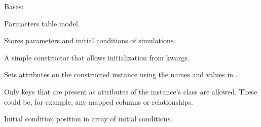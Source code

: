 \documentclass[a4paper,landscape,10pt,english]{sphinxmanual}
\begin{document}
\begin{fulllineitems}
\label{\detokenize{code_docs/simulation_API.model:simulation_API.model.models.ParameterDB}}
Bases: 

Parmaeters table model.

Stores parameters and initial conditions of simulations.

\begin{fulllineitems}
\label{\detokenize{code_docs/simulation_API.model:simulation_API.model.models.ParameterDB.__init__}}
A simple constructor that allows initialization from kwargs.

Sets attributes on the constructed instance using the names and
values in .

Only keys that are present as
attributes of the instance’s class are allowed. These could be,
for example, any mapped columns or relationships.

\end{fulllineitems}


\begin{fulllineitems}
\label{\detokenize{code_docs/simulation_API.model:simulation_API.model.models.ParameterDB.ini_cndtn_id}}
Initial condition position in array of initial conditions.

\end{fulllineitems}


\begin{fulllineitems}
\label{\detokenize{code_docs/simulation_API.model:simulation_API.model.models.ParameterDB.param_id}}
\end{fulllineitems}


\end{fulllineitems}
\end{document}
